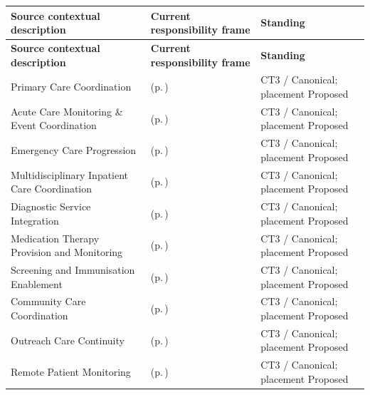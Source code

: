 \begin{longtable}{|>{\raggedright\arraybackslash}p{0.37\TableWidth}|>{\raggedright\arraybackslash}p{0.4\TableWidth}|>{\raggedright\arraybackslash}p{0.23\TableWidth}|}
\hline\rowcolor{TableHead}\textbf{Source contextual description} & \textbf{Current responsibility frame} & \textbf{Standing}\\\hline\endfirsthead
\hline\rowcolor{TableHead}\textbf{Source contextual description} & \textbf{Current responsibility frame} & \textbf{Standing}\\\hline\endhead
\hline\endfoot
Primary Care Coordination & \nameref{cap:bec-primary-care} (p.\,\pageref{cap:bec-primary-care}) & CT3 / Canonical; placement Proposed\\\hline
Acute Care Monitoring \& Event Coordination & \nameref{cap:bec-acute-care} (p.\,\pageref{cap:bec-acute-care}) & CT3 / Canonical; placement Proposed\\\hline
Emergency Care Progression & \nameref{cap:bec-emergency-care} (p.\,\pageref{cap:bec-emergency-care}) & CT3 / Canonical; placement Proposed\\\hline
Multidisciplinary Inpatient Care Coordination & \nameref{cap:bec-inpatient-care} (p.\,\pageref{cap:bec-inpatient-care}) & CT3 / Canonical; placement Proposed\\\hline
Diagnostic Service Integration & \nameref{cap:bec-diagnostic-services} (p.\,\pageref{cap:bec-diagnostic-services}) & CT3 / Canonical; placement Proposed\\\hline
Medication Therapy Provision and Monitoring & \nameref{cap:bec-medication-therapy} (p.\,\pageref{cap:bec-medication-therapy}) & CT3 / Canonical; placement Proposed\\\hline
Screening and Immunisation Enablement & \nameref{cap:bec-preventive-care} (p.\,\pageref{cap:bec-preventive-care}) & CT3 / Canonical; placement Proposed\\\hline
Community Care Coordination & \nameref{cap:bec-community-care} (p.\,\pageref{cap:bec-community-care}) & CT3 / Canonical; placement Proposed\\\hline
Outreach Care Continuity & \nameref{cap:bec-outreach-care} (p.\,\pageref{cap:bec-outreach-care}) & CT3 / Canonical; placement Proposed\\\hline
Remote Patient Monitoring & \nameref{cap:bec-remote-virtual-care} (p.\,\pageref{cap:bec-remote-virtual-care}) & CT3 / Canonical; placement Proposed\\\hline
\end{longtable}\endgroup
